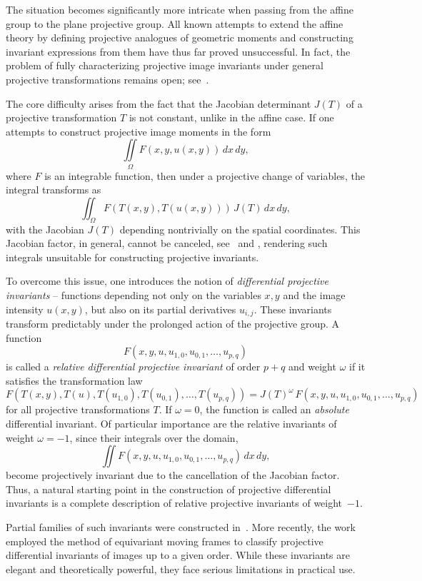 \documentclass[12pt,reqno]{amsart}
\begin{document}
The situation becomes significantly more intricate when passing from the affine group to the plane projective group. All known attempts to extend the affine theory by defining projective analogues of geometric moments and constructing invariant expressions from them have thus far proved unsuccessful. In fact, the problem of fully characterizing projective image invariants under general projective transformations remains open; see~\cite{Open}.

The core difficulty arises from the fact that the Jacobian determinant \( J(T) \) of a projective transformation \( T \) is not constant, unlike in the affine case. If one attempts to construct projective image moments in the form
\[
\iint\limits_{\Omega} F(x, y, u(x,y))\, dx\, dy,
\]
where \( F \) is an integrable function, then under a projective change of variables, the integral transforms as
\[
\iint_{\Omega} F(T(x,y), T(u(x,y)))\, J(T)\, dx\, dy,
\]
with the Jacobian \( J(T) \) depending nontrivially on the spatial coordinates. This Jacobian factor, in general, cannot be canceled, see~\cite{Van} and \cite{Suk2000}, rendering such integrals unsuitable for constructing projective invariants.

To overcome this issue, one introduces the notion of \emph{differential projective invariants} -- functions depending not only on the variables \( x, y \) and the image intensity \( u(x,y) \), but also on its partial derivatives \( u_{i,j} \). These invariants transform predictably under the prolonged action of the projective group.
A function
\[
F(x,y,u,u_{1,0},u_{0,1}, \ldots, u_{p,q})
\]
is called a \emph{relative differential projective invariant} of order \( p+q \) and weight \( \omega \) if it satisfies the transformation law
\[
F(T(x,y), T(u), T(u_{1,0}), T(u_{0,1}), \ldots, T( u_{p,q})) = J(T)^\omega\, F(x,y,u,u_{1,0},u_{0,1}, \ldots, u_{p,q})
\]
for all projective transformations \( T \). If \( \omega = 0 \), the function is called an \emph{absolute} differential invariant.
Of particular importance are the relative invariants of weight \( \omega = -1 \), since their integrals over the domain,
\[
\iint F(x,y,u,u_{1,0},u_{0,1}, \ldots, u_{p,q}) \, dx\,dy,
\]
become projectively invariant due to the cancellation of the Jacobian factor. Thus, a natural starting point in the construction of projective differential invariants is a complete description of relative projective invariants of weight~$-1$.

Partial families of such invariants were constructed in~\cite{Open}. More recently, the work~\cite{Olver2023} employed the method of equivariant moving frames to classify projective differential invariants of images up to a given order. While these invariants are elegant and theoretically powerful, they face serious limitations in practical use.
\end{document}
